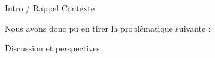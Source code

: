 \label{conclusion}

Intro / Rappel Contexte

Nous avons donc pu en tirer la problématique suivante :


Discussion et perspectives
